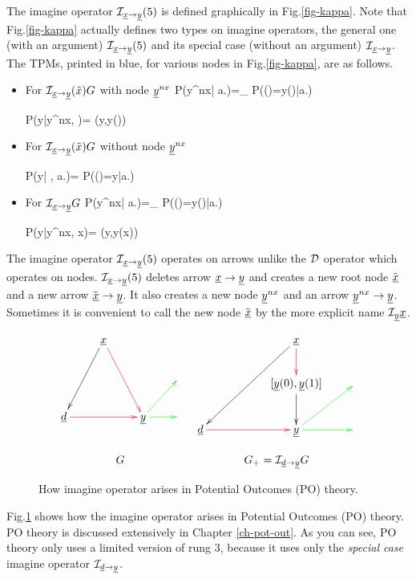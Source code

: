 The imagine operator  ${\cal I}_{{\underline{x}}\rightarrow {\underline{y}}}(5)$
is defined graphically in Fig.\ref{fig-kappa}.
Note that Fig.\ref{fig-kappa}
actually defines two types 
on imagine operators, the general one (with an argument)
${\cal I}_{{\underline{x}}\rightarrow {\underline{y}}}(5)$
and its special case (without an argument)
${\cal I}_{{\underline{x}}\rightarrow {\underline{y}}}$.
The TPMs, printed in blue, 
for various nodes in
Fig.\ref{fig-kappa}, are as follows.



\begin{itemize}
\item
For ${\cal I}_{{\underline{x}}\rightarrow {\underline{y}}}(\tilde{x})G$ 
with node ${\underline{y}}^{nx}$
\beq\color{blue}
P(y^{nx}| a.)=\prod_{}
P(\rvy()=y()|a.)
\eeq

\beq\color{blue}
P(y|y^{nx}, )=
\delta(y,y())
\eeq

\item
For ${\cal I}_{{\underline{x}}\rightarrow {\underline{y}}}(\tilde{x})G$ 
without node ${\underline{y}}^{nx}$

\beq\color{blue}
P(y| , a.)=
P(\rvy()=y|a.)
\eeq

\item
For ${\cal I}_{{\underline{x}}\rightarrow {\underline{y}}}G$
\beq\color{blue}
P(y^{nx}| a.)=\prod_{}
P(\rvy()=y()|a.)
\eeq

\beq\color{blue}
P(y|y^{nx}, x)=
\delta(y,y(x))
\eeq
\end{itemize}
The imagine operator 
${\cal I}_{{\underline{x}}\rightarrow{\underline{y}}}(5)$
operates on arrows
unlike the 
${\cal D}$ operator which operates on nodes.
${\cal I}_{{\underline{x}}\rightarrow{\underline{y}}}(5)$
deletes
arrow ${\underline{x}}\rightarrow{\underline{y}}$
and
creates a new root node 
$\tilde{{\underline{x}}}$
and a new arrow
$\tilde{{\underline{x}}}\rightarrow {\underline{y}}$. 
It also creates
a new node ${\underline{y}}^{nx}$
and an arrow ${\underline{y}}^{nx}\rightarrow {\underline{y}}$.
Sometimes it is convenient
to call the new node
 $\tilde{{\underline{x}}}$
by the more
explicit name ${\cal I}_{\underline{y}}{\underline{x}}$.


\begin{figure}[h!]
$$
\begin{array}{ccccc}
\xymatrix{
&\rvx\ar@[red][ddr]\ar[ddl]
\\
&&&
\\
\rvd\ar@[red][rr]
&
&\rvy\ar@[green][r]
\ar@[green][ur]
&
}
&
\xymatrix{
&&\rvx\ar[ddll]\ar@[red][d]
\\
&&[\rvy(0),\rvy(1)]\ar[d]
&
\\
\rvd\ar@[red][rr]
&
&\rvy\ar@[green][r]
\ar@[green][ur]
&
}
\\
\\
G&G_+=\cali_{\rvd\rarrow\rvy}G
\end{array}
$$
\caption{How 
 imagine operator 
arises in 
Potential Outcomes (PO)
theory.
} 
\label{fig-counterf-G-im-y0-y1}
\end{figure}
Fig.\ref{fig-counterf-G-im-y0-y1}
shows how the
imagine operator arises
in Potential Outcomes (PO) theory.
PO theory is discussed extensively
in Chapter \ref{ch-pot-out}.
As you can see, PO theory
only uses a limited version
of rung 3, because it uses only
the {\it special case}
imagine operator 
${\cal I}_{{\underline{d}}\rightarrow {\underline{y}}}$.


